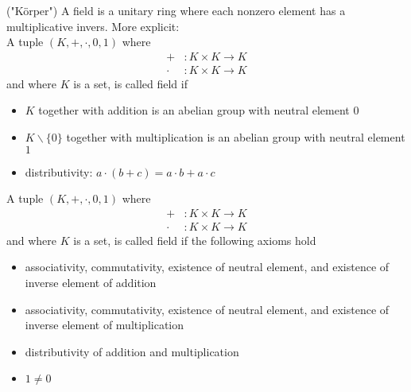 \begin{framed}
\begin{definition} ("Körper")
    A field is a unitary ring where each nonzero element has a multiplicative invers. More explicit:\\
    A tuple $(K, +, \cdot ,0,1)$ where 
    \begin{align}
        +     &: K\times K \rightarrow K \\
        \cdot &: K\times K \rightarrow K
    \end{align}
    and where $K$ is a set, is called field if 
    \begin{itemize}[itemsep=3pt, topsep=3pt]
        \item $K$ together with addition is an abelian group with neutral element $0$
        \item $K \backslash \{0\}$ together with multiplication is an abelian group with neutral element $1$
        \item distributivity: $a\cdot (b+c) = a\cdot b + a\cdot c$
    \end{itemize}
\end{definition}
\end{framed}

\begin{framed}
\begin{definition}
    A tuple $(K, +, \cdot ,0,1)$ where 
    \begin{align}
        +     &: K\times K \rightarrow K \\
        \cdot &: K\times K \rightarrow K
    \end{align}
    and where $K$ is a set, is called field if the following axioms hold
    \begin{itemize}[itemsep=3pt, topsep=3pt]
        \item associativity, commutativity, existence of neutral element, and existence of inverse element of addition
        \item associativity, commutativity, existence of neutral element, and existence of inverse element of multiplication
        \item distributivity of addition and multiplication
        \item $1\neq 0$
    \end{itemize}
\end{definition}
\end{framed}

